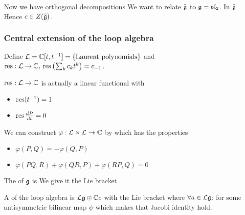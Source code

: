 \documentclass{article}
\begin{document}
Now we have orthogonal decompositions 
We want to relate $\hat{\mathfrak{g}}$ to $\mathfrak{g} = \mathfrak{sl}_2$. In $\hat{\mathfrak{g}}$
Hence $c \in Z(\hat{\mathfrak{g}})$. 

\subsubsection{Central extension of the loop algebra}

\begin{definition}
Define $\mathcal{L} = \mathbb{C}[t,t^{-1}] = \left\{ \text{Laurent polynomials} \right\}$ and $\operatorname{res}:\mathcal{L} \to \mathbb{C}, \, \operatorname{res}\left( \sum_k c_k t^k  \right) = c_{-1}$.  
\end{definition}
\begin{lemma}
	 $\operatorname{res} : \mathcal{L} \to \mathbb{C}$ is actually a linear functional with \begin{itemize}
    \item $\operatorname{res}(t^{-1}) = 1$ 
    \item $\operatorname{res} \frac{dP}{dt} = 0$
\end{itemize}
\end{lemma}
\begin{corollary}
We can construct $\varphi : \mathcal{L} \times \mathcal{L} \to \mathbb{C}$ by 
which has the properties 
\begin{itemize}
    \item $\varphi(P,Q) = - \varphi(Q,P)$
    \item $\varphi(PQ,R) + \varphi(QR,P) + \varphi(RP,Q) = 0$
\end{itemize}
\end{corollary}
\begin{definition}
The  of $\mathfrak{g}$ is 
We give it the Lie bracket 
\end{definition}

\begin{definition}
A  of the loop algebra is $\mathcal{L}\mathfrak{g} \oplus \mathbb{C}c$ with the Lie bracket where $\forall a \in \mathcal{L}\mathfrak{g}$;
for some antisymmetric bilinear map $\psi$ which makes that Jacobi identity hold. 
\end{definition}
\end{document}
